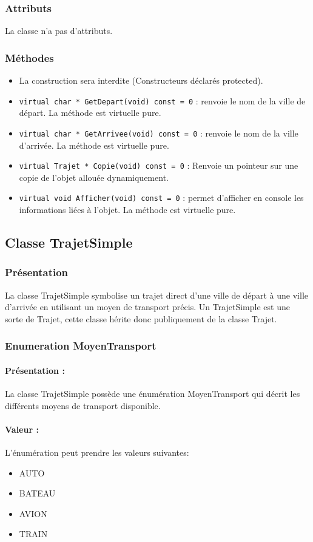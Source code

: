 \documentclass[10pt,a4paper,twoside]{article}
\begin{document}
\subsubsection{Attributs}
La classe n'a pas d'attributs.

\subsubsection{Méthodes}
\begin{itemize}
\item La construction sera interdite (Constructeurs déclarés protected).
\item \verb$virtual char * GetDepart(void) const = 0$ : renvoie le nom de la ville de départ. La méthode est virtuelle pure.
\item \verb$virtual char * GetArrivee(void) const = 0$ : renvoie le nom de la ville d'arrivée. La méthode est virtuelle pure.
\item \verb$virtual Trajet * Copie(void) const = 0$ : Renvoie un pointeur sur une copie de l'objet allouée dynamiquement.
\item \verb$virtual void Afficher(void) const = 0$ : permet d'afficher en console les informations liées à l'objet. La méthode est virtuelle pure.
\end{itemize}


\subsection{Classe TrajetSimple}
\subsubsection{Présentation}
La classe TrajetSimple symbolise un trajet direct d'une ville de départ à une ville d'arrivée en utilisant un moyen de transport précis. Un TrajetSimple est une sorte de Trajet, cette classe hérite donc publiquement de la classe Trajet.

\subsubsection{Enumeration MoyenTransport}
\paragraph{Présentation :} 
La classe TrajetSimple possède une énumération MoyenTransport qui décrit les différents moyens de transport disponible.
\paragraph{Valeur :} 
L'énumération peut prendre les valeurs suivantes:
\begin{itemize}
\item AUTO
\item BATEAU
\item AVION
\item TRAIN
\end{itemize}
\end{document}
